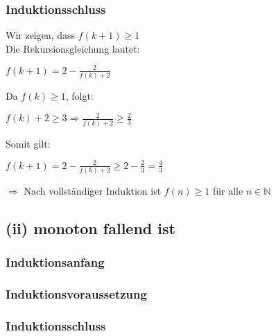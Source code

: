 \documentclass{article}
\begin{document}
\subsubsection{Induktionsschluss}
Wir zeigen, dass $f(k+1) \geq 1$ \\
Die Rekursionsgleichung lautet:\\
\begin{center}
$f(k+1) = 2- \frac{2}{f(k)+2}$ \\
\end{center}
Da $f(k) \geq 1$, folgt: \\
\begin{center}
$f(k)+2 \geq 3 \Longrightarrow \frac{2}{f(k)+2} \geq \frac{2}{3}$ \\
\end{center}
Somit gilt: \\
\begin{center}
$f(k+1)=2-\frac{2}{f(k)+2} \geq 2-\frac{2}{3} = \frac{4}{3}$ \\
\end{center}
$\Longrightarrow$ Nach vollständiger Induktion ist $f(n) \geq 1$ für alle $n \in \mathbb{N}$

\subsection{(ii) monoton fallend ist}
\subsubsection{Induktionsanfang}

\subsubsection{Induktionsvoraussetzung}

\subsubsection{Induktionsschluss}
\end{document}
